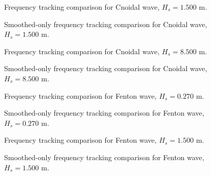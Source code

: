 \documentclass[11pt,letterpaper]{article}
\begin{document}
\begin{figure}[H]\centering
  \resizebox{\textwidth}{!}{}
  \caption{Frequency tracking comparison for Cnoidal wave, $H_s = 1.500$ m.}
  \label{fig:freqtrack_cnoidal_medium}
\end{figure}
\begin{figure}[H]\centering
  \resizebox{\textwidth}{!}{}
  \caption{Smoothed-only frequency tracking comparison for Cnoidal wave, $H_s = 1.500$ m.}
  \label{fig:freqtrack_cnoidal_medium_smooth}
\end{figure}

\begin{figure}[H]\centering
  \resizebox{\textwidth}{!}{}
  \caption{Frequency tracking comparison for Cnoidal wave, $H_s = 8.500$ m.}
  \label{fig:freqtrack_cnoidal_high}
\end{figure}
\begin{figure}[H]\centering
  \resizebox{\textwidth}{!}{}
  \caption{Smoothed-only frequency tracking comparison for Cnoidal wave, $H_s = 8.500$ m.}
  \label{fig:freqtrack_cnoidal_high_smooth}
\end{figure}

\begin{figure}[H]\centering
  \resizebox{\textwidth}{!}{}
  \caption{Frequency tracking comparison for Fenton wave, $H_s = 0.270$ m.}
  \label{fig:freqtrack_fenton_low}
\end{figure}
\begin{figure}[H]\centering
  \resizebox{\textwidth}{!}{}
  \caption{Smoothed-only frequency tracking comparison for Fenton wave, $H_s = 0.270$ m.}
  \label{fig:freqtrack_fenton_low_smooth}
\end{figure}

\begin{figure}[H]\centering
  \resizebox{\textwidth}{!}{}
  \caption{Frequency tracking comparison for Fenton wave, $H_s = 1.500$ m.}
  \label{fig:freqtrack_fenton_medium}
\end{figure}
\begin{figure}[H]\centering
  \resizebox{\textwidth}{!}{}
  \caption{Smoothed-only frequency tracking comparison for Fenton wave, $H_s = 1.500$ m.}
  \label{fig:freqtrack_fenton_medium_smooth}
\end{figure}
\end{document}
